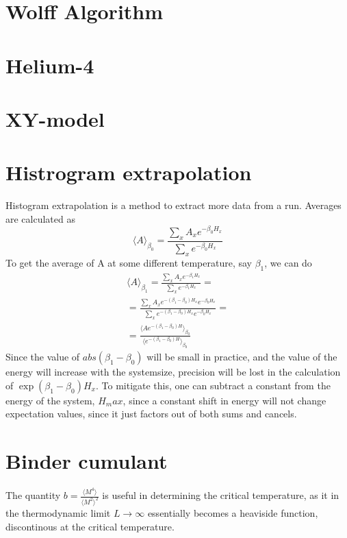 \documentclass[a4paper]{article}
\begin{document}
\section{Wolff Algorithm}

\section{Helium-4}
\section{XY-model}

\section{Histrogram extrapolation}
Histogram extrapolation is a method to extract more data from a run. 
Averages are calculated as
\begin{equation}
  \langle A \rangle_{\beta_0} =  \frac{\sum_{x}A_x e^{-\beta_0 H_x}}{\sum_{x}e^{-\beta_0 H_x}}
  \label{}
\end{equation}
To get the average of A at some different temperature, say $\beta_1$, we can do
\begin{align}
  \langle A\rangle_{\beta_1} =  \frac{\sum_{x}A_x e^{-\beta_1 H_x}}{\sum_{x}e^{-\beta_1 H_x}} = \\
  = \frac{\sum_x A_x e^{-(\beta_1 - \beta_0)H_x} e^{-\beta_0 H_x}}{\sum_x e^{-(\beta_1 - \beta_0)H_x}e^{-\beta_0 H_x}} = \\
  = \frac{\langle A e^{-(\beta_1 - \beta_0)H}\rangle_{\beta_0}}{\langle e^{-(\beta_1 - \beta_0)H}\rangle_{\beta_0}}
\end{align}
Since the value of $abs(\beta_1 -\beta_0)$ will be small in practice, and the value of the energy will increase with the systemsize, precision will be lost in the calculation of $\exp\left( \beta_1 - \beta_0 \right)H_x$. To mitigate this, one can subtract a constant from the energy of the system, $H_max$, since a constant shift in energy will not change expectation values, since it just factors out of both sums and cancels.
\section{Binder cumulant}
The quantity $b =\frac{\langle M^4 \rangle}{\langle M^2\rangle^2}$ is useful in determining the critical temperature, as it in the thermodynamic limit $L\rightarrow \infty $ essentially becomes a heaviside function, discontinous at the critical temperature. 
\end{document}
